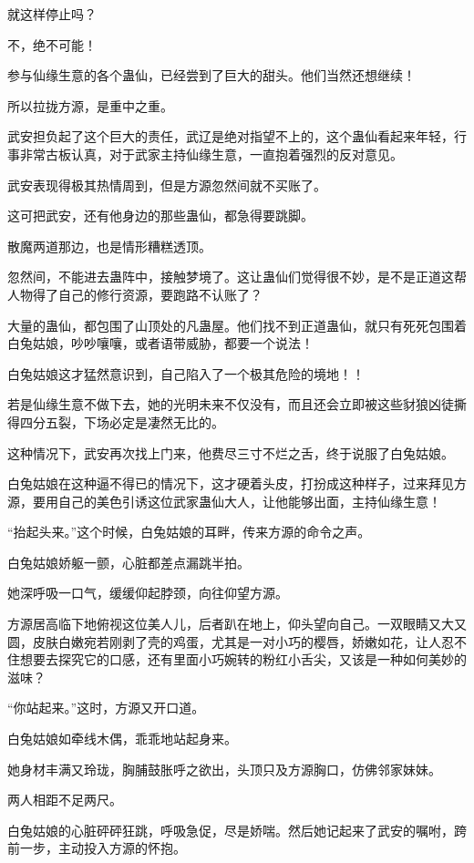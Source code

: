 \begin{this_body}
就这样停止吗？

不，绝不可能！

参与仙缘生意的各个蛊仙，已经尝到了巨大的甜头。他们当然还想继续！

所以拉拢方源，是重中之重。

武安担负起了这个巨大的责任，武辽是绝对指望不上的，这个蛊仙看起来年轻，行事非常古板认真，对于武家主持仙缘生意，一直抱着强烈的反对意见。

武安表现得极其热情周到，但是方源忽然间就不买账了。

这可把武安，还有他身边的那些蛊仙，都急得要跳脚。

散魔两道那边，也是情形糟糕透顶。

忽然间，不能进去蛊阵中，接触梦境了。这让蛊仙们觉得很不妙，是不是正道这帮人物得了自己的修行资源，要跑路不认账了？

大量的蛊仙，都包围了山顶处的凡蛊屋。他们找不到正道蛊仙，就只有死死包围着白兔姑娘，吵吵嚷嚷，或者语带威胁，都要一个说法！

白兔姑娘这才猛然意识到，自己陷入了一个极其危险的境地！！

若是仙缘生意不做下去，她的光明未来不仅没有，而且还会立即被这些豺狼凶徒撕得四分五裂，下场必定是凄然无比的。

这种情况下，武安再次找上门来，他费尽三寸不烂之舌，终于说服了白兔姑娘。

白兔姑娘在这种逼不得已的情况下，这才硬着头皮，打扮成这种样子，过来拜见方源，要用自己的美色引诱这位武家蛊仙大人，让他能够出面，主持仙缘生意！

“抬起头来。”这个时候，白兔姑娘的耳畔，传来方源的命令之声。

白兔姑娘娇躯一颤，心脏都差点漏跳半拍。

她深呼吸一口气，缓缓仰起脖颈，向往仰望方源。

方源居高临下地俯视这位美人儿，后者趴在地上，仰头望向自己。一双眼睛又大又圆，皮肤白嫩宛若刚剥了壳的鸡蛋，尤其是一对小巧的樱唇，娇嫩如花，让人忍不住想要去探究它的口感，还有里面小巧婉转的粉红小舌尖，又该是一种如何美妙的滋味？

“你站起来。”这时，方源又开口道。

白兔姑娘如牵线木偶，乖乖地站起身来。

她身材丰满又玲珑，胸脯鼓胀呼之欲出，头顶只及方源胸口，仿佛邻家妹妹。

两人相距不足两尺。

白兔姑娘的心脏砰砰狂跳，呼吸急促，尽是娇喘。然后她记起来了武安的嘱咐，跨前一步，主动投入方源的怀抱。


\end{this_body}
